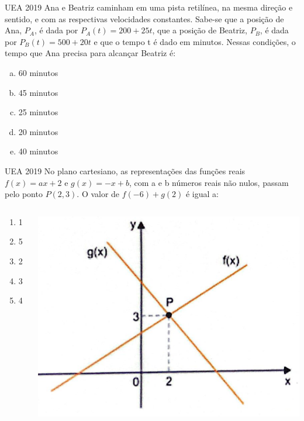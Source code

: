 \documentclass[11pt]{beamer}
\begin{document}
\begin{frame}{UEA 2019}
    Ana e Beatriz caminham em uma pista retilínea, na mesma direção e sentido, e com as respectivas velocidades constantes. Sabe-se que a posição de Ana, $P_{A}$, é dada por $P_{A}(t) = 200 + 25t$, que a posição de Beatriz, $P_{B}$, é dada por $P_{B}(t) = 500 + 20t$ e que o tempo t é dado em minutos. Nessas condições, o tempo que Ana precisa para alcançar Beatriz é:

    \begin{enumerate}[a)]
        \item 60 minutos %
        \item 45 minutos
        \item 25 minutos
        \item 20 minutos 
        \item 40 minutos
    \end{enumerate}
\end{frame}

\begin{frame}{UEA 2019}
    No plano cartesiano, as representações das funções reais $f(x)=ax+2$ e $g(x)=-x+b$, com a e b números reais não nulos, passam pelo ponto $P(2,3)$. O valor de $f(-6)+g(2)$ é igual a:

    \begin{columns}
        \begin{column}{0.4\textwidth}
            \begin{enumerate}[a]
                \item 1
                \item 5
                \item 2 %
                \item 3
                \item 4
            \end{enumerate}
        \end{column}

        \begin{column}{0.6\textwidth}
            \centering
            \includegraphics[scale=0.4]{imagens/q2.png}
        \end{column}
    \end{columns}

\end{frame}
\end{document}
